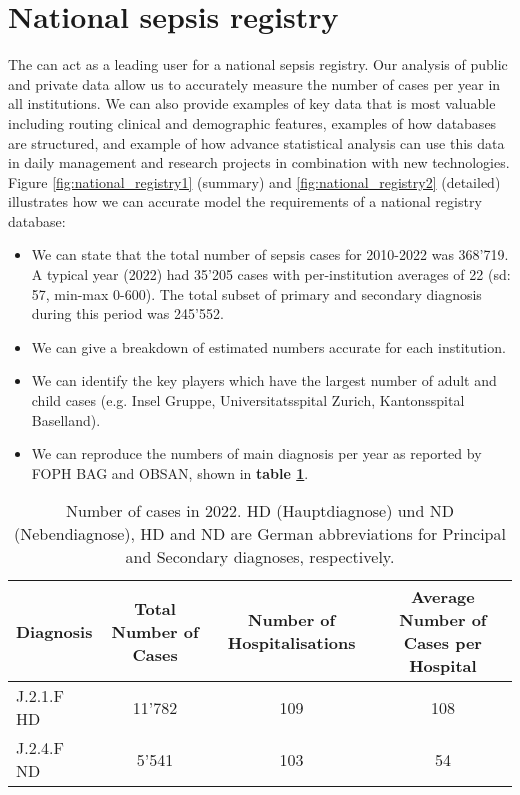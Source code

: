 

\section{National sepsis registry}
The \pmu can act as a leading user for a national sepsis registry.
Our analysis of public and private data allow us to accurately measure the number of cases per year in all institutions.
We can also provide examples of key data that is most valuable including routing clinical and demographic features, examples of how databases are structured, and example of how advance statistical analysis can use this data in daily management and research projects in combination with new technologies. 
Figure 
\ref{fig:national_registry1} (summary) and \ref{fig:national_registry2} (detailed)
 illustrates how we can accurate model the requirements of a national registry database:

\begin{itemize}
\item We can state that the total number of sepsis cases for 2010-2022 was 368'719. A typical year (2022) had 35'205 cases with per-institution averages of 22 (sd: 57, min-max 0-600). The total subset of primary and secondary diagnosis during this period was 245'552.
\item We can give a breakdown of estimated numbers accurate for each institution.
\item We can identify the key players which have the largest number of adult and child cases (e.g. Insel Gruppe, Universitatsspital Zurich, Kantonsspital Baselland).
\item We can reproduce the numbers of main diagnosis per year as reported by FOPH BAG and OBSAN, shown in \textbf{table \ref{tab:year_report}}.
\end{itemize}

\begin{table}[h!]
\centering
\caption{Number of cases in 2022. HD (Hauptdiagnose) und ND (Nebendiagnose), HD and ND are German abbreviations for Principal and Secondary diagnoses, respectively.}
\label{tab:number_of_cases}
\begin{tabular}{lccc}
\hline
\textbf{Diagnosis} & \textbf{Total Number of Cases} & \textbf{Number of Hospitalisations} & \textbf{Average Number of Cases per Hospital} \\
\hline
J.2.1.F HD & 11'782 & 109 & 108 \\
J.2.4.F ND & 5'541 & 103 & 54 \\
\hline
\end{tabular}
    \label{tab:year_report}
\end{table}

